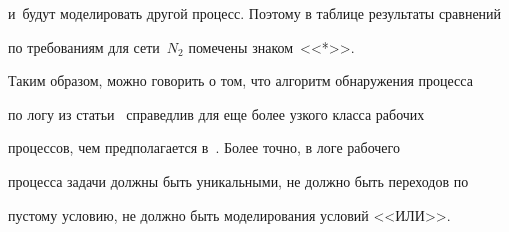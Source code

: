 и~будут моделировать другой процесс. Поэтому в таблице результаты сравнений 

по требованиям для сети~$N_2$ помечены знаком~<<*>>.

  

  Таким образом, можно говорить о том, что алгоритм обнаружения процесса 

по логу из статьи~\cite{5-tg} справедлив для еще более узкого класса рабочих 

процессов, чем предполагается в~\cite{5-tg}. Более точно, в логе рабочего 

процесса задачи должны быть уникальными, не должно быть переходов по 

пустому условию, не должно быть моделирования условий <<ИЛИ>>.

   

